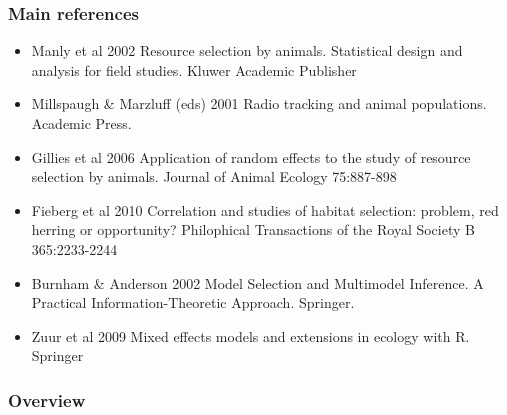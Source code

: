 \documentclass[10pt]{beamer}
\begin{document}

\begin{frame}[fragile]
\frametitle{Main references}

\begin{itemize}
\item Manly et al 2002 Resource selection by animals. Statistical design and analysis for field studies. Kluwer Academic Publisher
\item Millspaugh \& Marzluff (eds) 2001 Radio tracking and animal populations. Academic Press.
\item Gillies et al 2006 Application of random effects to the study of resource selection by animals. Journal of Animal Ecology 75:887-898
\item Fieberg et al 2010 Correlation and studies of habitat selection: problem, red herring or opportunity? Philophical Transactions of the Royal Society B 365:2233-2244
\item Burnham \& Anderson 2002 Model Selection and Multimodel Inference. A Practical Information-Theoretic Approach. Springer.
\item Zuur et al 2009 Mixed effects models and extensions in ecology with R. Springer
\end{itemize}

\end{frame}



\begin{frame}
\frametitle{Overview} %
\tableofcontents %
\end{frame}
\end{document}
